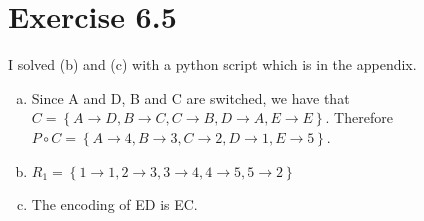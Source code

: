 \documentclass{article} %
\newcommand{\homeworkNumber}{6}
\begin{document}
\section*{Exercise \homeworkNumber.5}
I solved (b) and (c) with a python script which is in the appendix.
\begin{enumerate}[(a)]
	\item Since A and D, B and C are switched, we have that \( C = \left\{ A \to D, B \to C, C \to B, D \to A, E \to E \right\}  \). Therefore \( P \circ C = \left\{ A \to 4, B \to 3, C \to 2, D \to 1, E \to 5 \right\} \).
	\item \( R_{1} = \left\{ 1 \to 1, 2 \to 3, 3 \to 4, 4 \to 5, 5 \to 2 \right\}  \)
	\item The encoding of ED is EC.
\end{enumerate}
\end{document}
